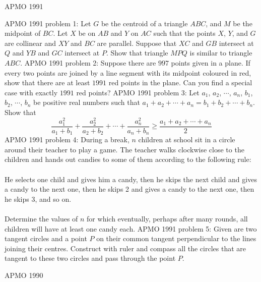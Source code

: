 APMO 1991 

APMO 1991 problem 1:  Let $G$ be the centroid of a triangle $ABC$, and $M$ be the midpoint of $BC$.  Let $X$ be on $AB$ and $Y$ on $AC$ such that the points $X$, $Y$, and $G$ are collinear and $XY$ and $BC$ are parallel.  Suppose that $XC$ and $GB$ intersect at $Q$ and $YB$ and $GC$ intersect at $P$.  Show that triangle $MPQ$ is similar to triangle $ABC$. 
APMO 1991 problem 2:  Suppose there are $997$ points given in a plane.  If every two points are joined by a line segment with its midpoint coloured in red, show that there are at least $1991$ red points in the plane.  Can you find a special case with exactly $1991$ red points? 
APMO 1991 problem 3:  Let $a_1$, $a_2$, $\cdots$, $a_n$, $b_1$, $b_2$, $\cdots$, $b_n$ be positive real numbers such that $a_1 + a_2 + \cdots + a_n = b_1 + b_2 + \cdots + b_n$.  Show that
\[
\frac{a_1^2}{a_1 + b_1} + \frac{a_2^2}{a_2 + b_2} + \cdots + \frac{a_n^2}{a_n + b_n} \geq \frac{a_1 + a_2 + \cdots + a_n}{2}
\] 
APMO 1991 problem 4:  During a break, $n$ children at school sit in a circle around their teacher to play a game.  The teacher walks clockwise close to the children and hands out candies to some of them according to the following rule: \\\\
He selects one child and gives him a candy, then he skips the next child and gives a candy to the next one, then he skips 2 and gives a candy to the next one, then he skips 3, and so on. \\\\
Determine the values of $n$ for which eventually, perhaps after many rounds, all children will have at least one candy each. 
APMO 1991 problem 5:  Given are two tangent circles and a point $P$ on their common tangent perpendicular to the lines joining their centres.  Construct with ruler and compass all the circles that are tangent to these two circles and pass through the point $P$. 

APMO 1990 

